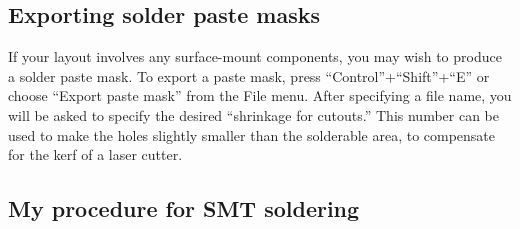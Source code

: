\documentclass[11pt]{report}
\begin{document}
\subsection{Exporting solder paste masks}

If your layout involves any surface-mount components, you may wish to
produce a solder paste mask. To export a paste mask,
press ``Control''+``Shift''+``E'' or choose ``Export paste mask'' from
the File menu. After specifying a file name, you will be asked to
specify the desired ``shrinkage for cutouts.'' This number can be used
to make the holes slightly smaller than the solderable area, to
compensate for the kerf of a laser cutter.

\subsection{My procedure for SMT soldering}
\end{document}

